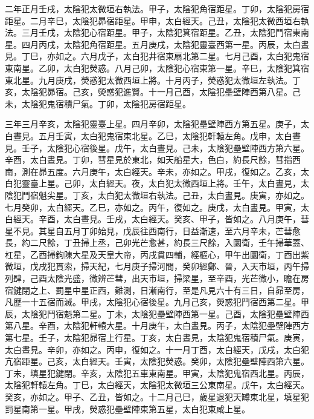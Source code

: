 \begin{pinyinscope}
 二年正月壬戌，太陰犯太微垣右執法。甲子，太陰犯角宿距星。丁卯，太陰犯房宿距星。二月辛巳，太陰犯昴宿距星。甲申，太白經天。己丑，太陰犯太微西垣右執法。三月壬戌，太陰犯心宿距星。甲子，太陰犯箕宿距星。乙丑，太陰犯鬥宿東南星。四月丙戌，太陰犯角宿距星。五月庚戌，太陰犯靈臺西第一星。丙辰，太白晝見。丁巳，亦如之。六月戊子，太白犯井宿東扇北第二星。七月己酉，太白犯鬼宿東南星。乙卯，太白犯熒惑。八月己卯，太陰犯心宿東第一星。辛巳，太陰犯箕宿東北星。九月庚戌，熒惑犯太微西垣上將。十月丙子，熒惑犯太微垣左執法。丁亥，太陰犯昴宿。己亥，熒惑犯進賢。十一月己酉，太陰犯壘壁陣西第八星。己未，太陰犯鬼宿積尸氣。丁卯，太陰犯房宿距星。



 三年三月辛亥，太陰犯靈臺上星。四月辛卯，太陰犯壘壁陣西方第五星。庚子，太白晝見。五月壬寅，太白犯鬼宿東北星。乙巳，太陰犯軒轅左角。戊申，太白晝見。壬子，太陰犯心宿後星。戊午，太白晝見。己未，太陰犯壘壁陣西方第六星。辛酉，太白晝見。丁卯，彗星見於東北，如天船星大，色白，約長尺餘，彗指西南，測在昴五度。六月庚午，太白經天。辛未，亦如之。甲戌，復如之。乙亥，太白犯靈臺上星。己卯，太白經天。夜，太白犯太微西垣上將。壬午，太白晝見，太陰犯鬥宿魁尖星。丁亥，太白犯太微垣右執法。己丑，太白晝見。庚寅，亦如之。七月癸卯，太白經天。乙巳，亦如之。丙午，復如之。庚戌，太白晝見。甲寅，太白經天。辛酉，太白晝見。壬戌，太白經天。癸亥、甲子，皆如之。八月庚午，彗星不見。其星自五月丁卯始見，戊辰往西南行，日益漸速，至六月辛未，芒彗愈長，約二尺餘，丁丑掃上丞，己卯光芒愈甚，約長三尺餘，入圜衛，壬午掃華蓋、杠星，乙酉掃鉤陳大星及天皇大帝，丙戌貫四輔，經樞心，甲午出圜衛，丁酉出紫微垣，戊戌犯貫索，掃天紀，七月庚子掃河間，癸卯經鄭、晉，入天市垣，丙午掃列肆，己酉太陰光盛，微辨芒彗，出天市垣，掃梁星，至辛酉，光芒微小，瞻在房宿鍵閉之上、罰星中星正西，難測，日漸南行，至是凡見六十有三日，自昴至房，凡歷一十五宿而滅。甲戌，太陰犯心宿後星。九月己亥，熒惑犯鬥宿西第二星。甲辰，太陰犯鬥宿魁第二星。丁未，太陰犯壘壁陣西第一星。己酉，太陰犯壘壁陣西第八星。辛酉，太陰犯軒轅大星。十月庚午，太白晝見。丙子，太陰犯壘壁陣西方第七星。壬子，太陰犯昴宿上行星。丁亥，太白晝見，太陰犯鬼宿積尸氣。庚寅，太白晝見。辛卯，亦如之。丙申，復如之。十一月丁酉，太白經天，戊戌，太白犯亢宿距星。己亥，太白經天。壬寅，太陰犯熒惑。癸卯，太陰犯壘壁陣西第六星。丁未，填星犯鍵閉。辛亥，太陰犯五車東南星。甲寅，太陰犯鬼宿西北星。丙辰，太陰犯軒轅左角。丁巳，太白經天，太陰犯太微垣三公東南星。戊午，太白經天。癸亥，亦如之。甲子、乙丑，皆如之。十二月己巳，歲星退犯天罇東北星，填星犯罰星南第一星。甲戌，熒惑犯壘壁陣東第五星，太白犯東咸上星。




\end{pinyinscope}

